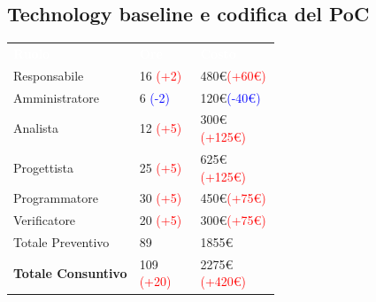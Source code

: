 \subsection{Technology baseline e codifica del PoC}
{\renewcommand{\arraystretch}{2.0}
    \begin{center}
        \begin{tabular}{P{0.25\linewidth}P{0.15\linewidth}P{0.20\linewidth}}
            \textcolor{white}{\textbf{Ruolo}} & \textcolor{white}{\textbf{Ore}} & \textcolor{white}{\textbf{Costo}}\\
            Responsabile & 16 \textcolor{red}{(+2)} & 480\euro \space \textcolor{red}{(+60\euro)}\\
                
            Amministratore & 6 \textcolor{blue}{(-2)} & 120\euro \space \textcolor{blue}{(-40\euro)} \\
    
            Analista & 12 \textcolor{red}{(+5)} & 300\euro \space \textcolor{red}{(+125\euro)}\\
    
            Progettista & 25 \textcolor{red}{(+5)} & 625\euro \space \textcolor{red}{(+125\euro)}\\
    
            Programmatore & 30 \textcolor{red}{(+5)} & 450\euro \space \textcolor{red}{(+75\euro)}\\
    
            Verificatore & 20 \textcolor{red}{(+5)} & 300\euro \space \textcolor{red}{(+75\euro)}\\
    
            \hline\hline
    
            Totale Preventivo & 89 & 1855\euro\\
    
            \textbf{Totale Consuntivo} & 109 \textcolor{red}{(+20)} & 2275\euro \space \textcolor{red}{(+420\euro)}\\
        \end{tabular}
    \end{center}    
}
